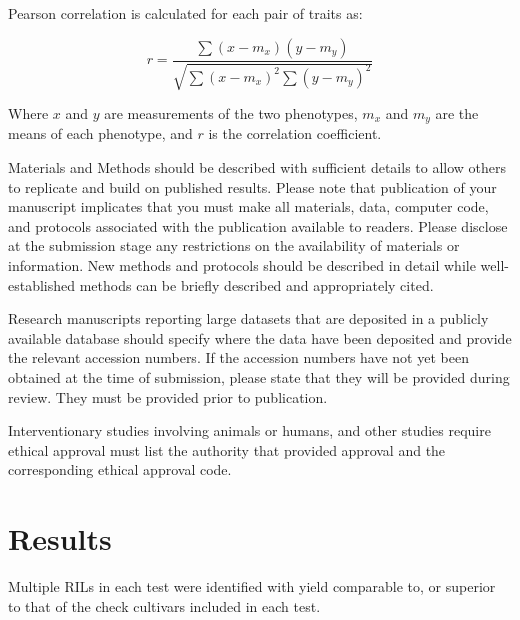 \documentclass[Agronomy,article,submit,moreauthors,pdftex]{mdpi}
\begin{document}
Pearson correlation is calculated for each pair of traits as:

\[r = \frac{\sum{(x-m_x)(y-m_y)}}{\sqrt{\sum{(x-m_x)^2}\sum{(y-m_y)^2}}}\]

Where \(x\) and \(y\) are measurements of the two phenotypes, \(m_x\)
and \(m_y\) are the means of each phenotype, and \(r\) is the
correlation coefficient.

Materials and Methods should be described with sufficient details to
allow others to replicate and build on published results. Please note
that publication of your manuscript implicates that you must make all
materials, data, computer code, and protocols associated with the
publication available to readers. Please disclose at the submission
stage any restrictions on the availability of materials or information.
New methods and protocols should be described in detail while
well-established methods can be briefly described and appropriately
cited.

Research manuscripts reporting large datasets that are deposited in a
publicly available database should specify where the data have been
deposited and provide the relevant accession numbers. If the accession
numbers have not yet been obtained at the time of submission, please
state that they will be provided during review. They must be provided
prior to publication.

Interventionary studies involving animals or humans, and other studies
require ethical approval must list the authority that provided approval
and the corresponding ethical approval code.

\hypertarget{results}{%
\section{Results}\label{results}}

Multiple RILs in each test were identified with yield comparable to, or
superior to that of the check cultivars included in each test.
\end{document}
